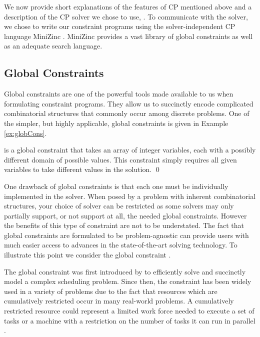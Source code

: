 We now provide short explanations of the features of CP mentioned above
and a description of the CP solver we chose to use, \chuffed.
To communicate with the solver, we chose to write our constraint
programs using the solver-independent CP language 
MiniZinc \cite{Nethercote2007}.
MiniZinc provides a vast library of global constraints
as well as an adequate search language.

\subsection{Global Constraints}
\label{sec:lit:cpGlob}
Global constraints are one of the powerful tools made available to us
when formulating constraint programs. They allow us to succinctly encode
complicated combinatorial structures that commonly occur among
discrete problems. One of the simpler, 
but highly applicable, global constraints is given in
Example \ref{ex:globCons}.

\begin{example}\label{ex:globCons}
	\aldif is a global constraint that takes an array of integer
	variables, each with a possibly different domain of possible values. This constraint
	simply requires all given variables to take different values in the solution. \qed
\end{example}

One drawback of global constraints is that each one must be individually
implemented in the solver. When posed by a problem with inherent combinatorial
structures, your choice of solver can be restricted as some solvers may
only partially support, or not support at all, the needed global constraints.
However the benefits of this type of constraint are not to be understated.
The fact that global constraints are formulated to be problem-agnostic can
provide users with much easier access to advances in the state-of-the-art solving technology.
To illustrate this point we consider the global constraint \cumu.

The \cumu global constraint was first introduced by 
to efficiently solve and succinctly model a complex scheduling
problem.
Since then, the \cumu constraint has been widely used in a variety of problems
due to the fact that resources which are cumulatively restricted occur in many real-world problems.
A cumulatively restricted resource could represent a limited work force needed to execute a set
of tasks or a machine with a restriction on the number
of tasks it can run in parallel \cite{Schutt2011a}.

